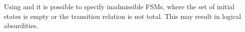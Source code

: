 Using  and  it is possible to specify
inadmissible FSMs, where the set of initial states is empty
or the transition relation is not total. This may result in logical
absurdities.
